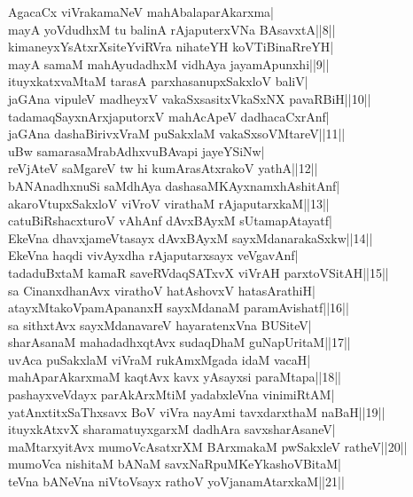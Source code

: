 \documentclass{article}
\begin{document}
AgacaCx viVrakamaNeV mahAbalaparAkarxma|\\
mayA yoVdudhxM tu balinA rAjaputerxVNa BAsavxtA||8||\\
kimaneyxYsAtxrXsiteYviRVra nihateYH koVTiBinaRreYH|\\
mayA samaM mahAyudadhxM vidhAya jayamApunxhi||9||\\
ituyxkatxvaMtaM tarasA parxhasanupxSakxloV baliV|\\
jaGAna vipuleV madheyxV vakaSxsasitxVkaSxNX pavaRBiH||10||\\
tadamaqSayxnArxjaputorxV mahAcApeV dadhacaCxrAnf|\\
jaGAna dashaBirivxVraM puSakxlaM vakaSxsoVMtareV||11||\\
uBw samarasaMrabAdhxvuBAvapi jayeYSiNw|\\
reVjAteV saMgareV tw hi kumArasAtxrakoV yathA||12||\\
bANAnadhxnuSi saMdhAya dashasaMKAyxnamxhAshitAnf|\\
akaroVtupxSakxloV viVroV virathaM rAjaputarxkaM||13||\\
catuBiRshacxturoV vAhAnf dAvxBAyxM sUtamapAtayatf|\\
EkeVna dhavxjameVtasayx dAvxBAyxM sayxMdanarakaSxkw||14||\\
EkeVna haqdi vivAyxdha rAjaputarxsayx veVgavAnf|\\
tadaduBxtaM kamaR saveRVdaqSATxvX viVrAH parxtoVSitAH||15||\\
sa CinanxdhanAvx virathoV hatAshovxV hatasArathiH|\\
atayxMtakoVpamApananxH sayxMdanaM paramAvishatf||16||\\
sa sithxtAvx sayxMdanavareV hayaratenxVna BUSiteV|\\
sharAsanaM mahadadhxqtAvx sudaqDhaM guNapUritaM||17||\\
uvAca puSakxlaM viVraM rukAmxMgada idaM vacaH|\\
mahAparAkarxmaM kaqtAvx kavx yAsayxsi paraMtapa||18||\\
pashayxveVdayx parAkArxMtiM yadabxleVna vinimiRtAM|\\
yatAnxtitxSaThxsavx BoV viVra nayAmi tavxdarxthaM naBaH||19||\\
ituyxkAtxvX sharamatuyxgarxM dadhAra savxsharAsaneV|\\
maMtarxyitAvx mumoVcAsatxrXM BArxmakaM pwSakxleV ratheV||20||\\
mumoVca nishitaM bANaM savxNaRpuMKeYkashoVBitaM|\\
teVna bANeVna niVtoVsayx rathoV yoVjanamAtarxkaM||21||\\
\end{document}
